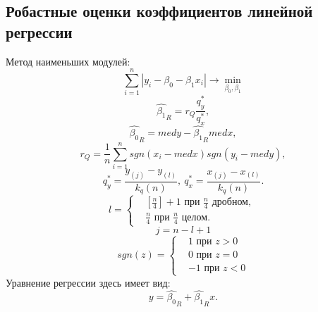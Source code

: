 \subsection{Робастные оценки коэффициентов линейной регрессии}
\begin{flushleft}
	Метод наименьших модулей:
	\begin{equation}
		\sum_{i=1}^{n}{|y_{i} - \beta_{0} - \beta_{1}x_{i}|}\rightarrow \min_{\beta_{0}, \beta_{1}}
		\label{min_abs}
	\end{equation}
	\begin{equation}
		\hat{\beta_{1}}_{R} = r_{Q}\frac{q^{*}_{y}}{q^{*}_{x}},
		\label{b_1R}
	\end{equation}
	\begin{equation}
		\hat{\beta_{0}}_{R} = med y - \hat{\beta_{1}}_{R} med x,
		\label{b_0R}
	\end{equation}
	\begin{equation}
		r_{Q} = \frac{1}{n}\sum_{i=1}^{n}{sgn(x_{i} - med x)sgn(y_{i} - med y)},
		\label{r_Q}
	\end{equation}
	\begin{equation}
		q^{*}_{y} = \frac{y_{(j)} -y_{(l)}}{k_{q}(n)},~
		q^{*}_{x} = \frac{x_{(j)} - x_{(l)}}{k_{q}(n)}.
		\label{q*} 
	\end{equation}
	\begin{displaymath}
		l = \begin{cases}
			& [\frac{n}{4}] + 1 \text{ при } \frac{n}{4} \text{ дробном, } \\ 
			& \frac{n}{4} \text{ при } \frac{n}{4} \text{ целом. }
		\end{cases}
	\end{displaymath}
	\begin{displaymath}
		j = n - l + 1
	\end{displaymath}
	\begin{displaymath}
		sgn(z) = \begin{cases}
			& 1 \text{ при } z > 0 \\ 
			& 0 \text{ при } z = 0 \\
			& -1 \text{ при } z < 0
		\end{cases}
	\end{displaymath}
	Уравнение регрессии здесь имеет вид:
	\begin{equation}
		y = \hat{\beta_{0}}_{R} +  \hat{\beta_{1}}_{R}x.
		\label{y}
	\end{equation}
\end{flushleft}

